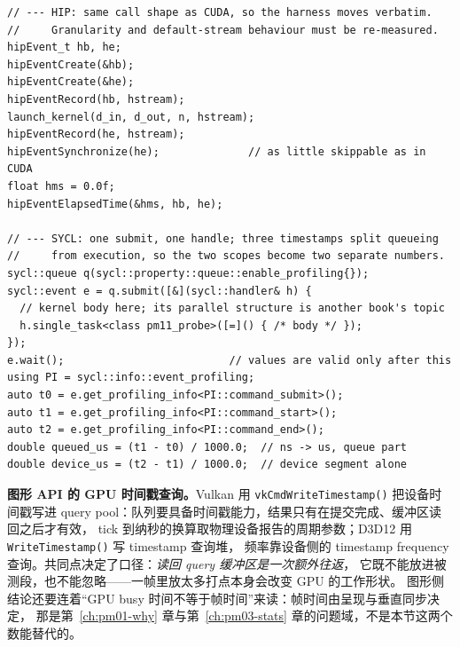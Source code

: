 \documentclass[12pt,a4paper,fontset=fandol]{ctexbook}
\newcommand{\Fn}[1]{\texttt{#1()}}
\newcommand{\Bk}{\discretionary{}{}{}}
\begin{document}
\begin{lstlisting}[style=cppstyle, caption={HIP 与 SYCL 的计时边界对照片段：同一套协议，落点不同（形态片段，不含实测值）}, label={lst:pm11-port}]
// --- HIP: same call shape as CUDA, so the harness moves verbatim.
//     Granularity and default-stream behaviour must be re-measured.
hipEvent_t hb, he;
hipEventCreate(&hb);
hipEventCreate(&he);
hipEventRecord(hb, hstream);
launch_kernel(d_in, d_out, n, hstream);
hipEventRecord(he, hstream);
hipEventSynchronize(he);              // as little skippable as in CUDA
float hms = 0.0f;
hipEventElapsedTime(&hms, hb, he);

// --- SYCL: one submit, one handle; three timestamps split queueing
//     from execution, so the two scopes become two separate numbers.
sycl::queue q(sycl::property::queue::enable_profiling{});
sycl::event e = q.submit([&](sycl::handler& h) {
  // kernel body here; its parallel structure is another book's topic
  h.single_task<class pm11_probe>([=]() { /* body */ });
});
e.wait();                          // values are valid only after this
using PI = sycl::info::event_profiling;
auto t0 = e.get_profiling_info<PI::command_submit>();
auto t1 = e.get_profiling_info<PI::command_start>();
auto t2 = e.get_profiling_info<PI::command_end>();
double queued_us = (t1 - t0) / 1000.0;  // ns -> us, queue part
double device_us = (t2 - t1) / 1000.0;  // device segment alone
\end{lstlisting}

\textbf{图形 API 的 GPU 时间戳查询。}Vulkan 用 \Fn{vkCmd{\Bk}Write{\Bk}Timestamp}
把设备时间戳写进 query pool：队列要具备时间戳能力，结果只有在提交完成、缓冲区读回之后才有效，
tick 到纳秒的换算取物理设备报告的周期参数；D3D12 用 \Fn{Write{\Bk}Timestamp} 写 timestamp 查询堆，
频率靠设备侧的 timestamp frequency 查询。共同点决定了口径：\emph{读回 query 缓冲区是一次额外往返}，
它既不能放进被测段，也不能忽略——一帧里放太多打点本身会改变 GPU 的工作形状。
图形侧结论还要连着``GPU busy 时间不等于帧时间''来读：帧时间由呈现与垂直同步决定，
那是第~\ref{ch:pm01-why} 章与第~\ref{ch:pm03-stats} 章的问题域，不是本节这两个数能替代的。
\end{document}
